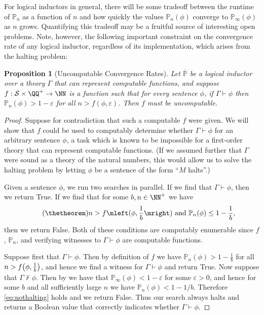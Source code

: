 \documentclass[authordate,onecolumn,noenvironments]{miri-tech-article}
\numberwithin{equation}{subsection}
\newtheorem{proposition}[theorem]{Proposition}
\newcommand{\seq}[1]{{\overline{#1}}}
\newcommand{\nn}{n}
\newcommand{\representscomputations}{can represent computable functions}
\newcommand{\BelState}{\mathbb{P}}
\newcommand{\pt}{\BelState}
\newcommand{\MP}{\seq{\pt}}
\newcommand{\Theory}{\Gamma}
\newcommand{\Sentences}{\mathcal{S}}
\begin{document}
For logical inductors in general, there will be some tradeoff between the runtime of $\pt_\nn$ as a function of $\nn$ and how quickly the values $\pt_\nn(\phi)$ converge to $\pt_\infty(\phi)$ as $\nn$ grows.  Quantifying this tradeoff may be a fruitful source of interesting open problems.  Note, however, the following important constraint on the convergence rate of any logical inductor, regardless of its implementation, which arises from the halting problem:

\begin{proposition}[Uncomputable Convergence Rates]
Let $\MP$ be a logical inductor over a theory $\Theory$ that \representscomputations, and suppose $f:\Sentences\times\QQ^+\to\NN$ is a function such that for every sentence $\phi$, if $\Theory\vdash\phi$ then $\pt_\nn(\phi) > 1-\varepsilon$ for all $\nn>f(\phi,\varepsilon)$.  Then $f$ must be uncomputable.
\end{proposition}
\begin{proof}
  Suppose for contradiction that such a computable $f$ were given.  We will show that $f$ could be used to computably determine whether $\Theory\vdash\phi$ for an arbitrary sentence $\phi$, a task which is known to be impossible for a first-order theory that \representscomputations. (If we assumed further that $\Theory$ were sound as a theory of the natural numbers, this would allow us to solve the halting problem by letting $\phi$ be a sentence of the form ``$M$ halts''.)

  Given a sentence $\phi$, we run two searches in parallel. If we find that $\Theory \vdash \phi$, then we return True. If we find that for some $b,n\in\NN^+$ we have
  \begin{equation}\tag{\thetheorem}\label{eq:nothalting}
    n>f\mleft(\phi,\frac{1}{b}\mright) \text{~and~} \pt_\nn(\phi)\leq 1-\frac{1}{b},
  \end{equation}
  then we return False. Both of these conditions are computably enumerable since $f$, $\pt_n$, and verifying witnesses to $\Theory \vdash \phi$ are computable functions. 

  Suppose first that  $\Theory \vdash \phi$. Then by definition of $f$ we have $\pt_\nn(\phi)>1-\frac{1}{b}$ for all   $n>f\mleft(\phi,\frac{1}{b}\mright)$, and hence we find a witness for $\Theory \vdash \phi$ and return True. Now suppose that  $\Theory \nvdash \phi$. Then by  we have that $\pt_\infty(\phi)<1-\varepsilon$ for some $\varepsilon>0$, and hence for some $b$ and all sufficiently large $n$ we have $\pt_n(\phi)<1-1/b$. Therefore \ref{eq:nothalting} holds and we return False. Thus our search always halts and returns a Boolean value that correctly indicates whether $\Theory \vdash \phi$. 
\end{proof}
\end{document}
